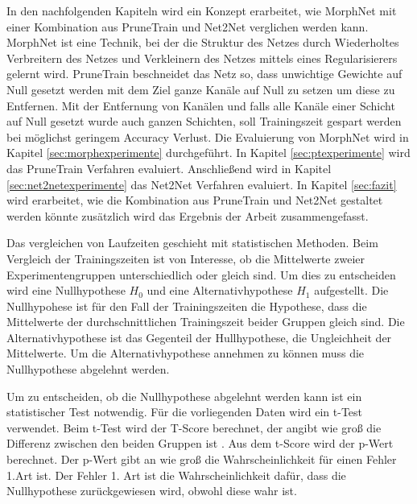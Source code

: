In den nachfolgenden Kapiteln wird ein Konzept erarbeitet, wie MorphNet mit einer Kombination aus PruneTrain und Net2Net verglichen werden kann. MorphNet ist eine Technik, bei der die Struktur des Netzes durch Wiederholtes Verbreitern des Netzes und Verkleinern des Netzes mittels eines Regularisierers gelernt wird.
PruneTrain beschneidet das Netz so, dass unwichtige Gewichte auf Null gesetzt werden mit dem Ziel ganze Kanäle auf Null zu setzen um diese zu Entfernen. Mit der Entfernung von Kanälen und falls alle Kanäle einer Schicht auf Null gesetzt wurde auch ganzen Schichten, soll Trainingszeit gespart werden bei möglichst geringem Accuracy Verlust.
Die Evaluierung von MorphNet wird in Kapitel \ref{sec:morphexperimente} durchgeführt. In Kapitel \ref{sec:ptexperimente} wird das PruneTrain Verfahren evaluiert.  Anschließend wird in Kapitel \ref{sec:net2netexperimente} das Net2Net Verfahren evaluiert. In Kapitel \ref{sec:fazit} wird erarbeitet, wie die Kombination aus PruneTrain und Net2Net gestaltet werden könnte zusätzlich wird das Ergebnis der Arbeit zusammengefasst.

Das vergleichen von Laufzeiten geschieht mit statistischen Methoden. Beim Vergleich der Trainingszeiten ist von Interesse, ob die Mittelwerte zweier Experimentengruppen unterschiedlich oder gleich sind. Um dies zu entscheiden wird eine Nullhypothese $H_0$ und eine Alternativhypothese $H_1$ aufgestellt\cite{stat}. 
Die Nullhypohese ist für den Fall der Trainingszeiten die Hypothese, dass die Mittelwerte der durchschnittlichen Trainingszeit beider Gruppen gleich sind\cite{stat}. Die Alternativhypothese ist das Gegenteil der Hullhypothese, die Ungleichheit der Mittelwerte\cite{stat}. Um die Alternativhypothese annehmen zu können muss die Nullhypothese abgelehnt werden\cite{stat}.


Um zu entscheiden, ob die Nullhypothese abgelehnt werden kann ist ein statistischer Test notwendig\cite{stat}. Für die vorliegenden Daten wird ein t-Test verwendet. Beim t-Test wird der T-Score berechnet, der angibt wie groß die Differenz zwischen den beiden Gruppen ist \cite{stat}. Aus dem t-Score wird der p-Wert berechnet. Der p-Wert gibt an wie groß die Wahrscheinlichkeit für einen Fehler 1.Art ist. Der Fehler 1. Art ist die Wahrscheinlichkeit dafür, dass die Nullhypothese zurückgewiesen wird, obwohl diese wahr ist\cite{stat}.
